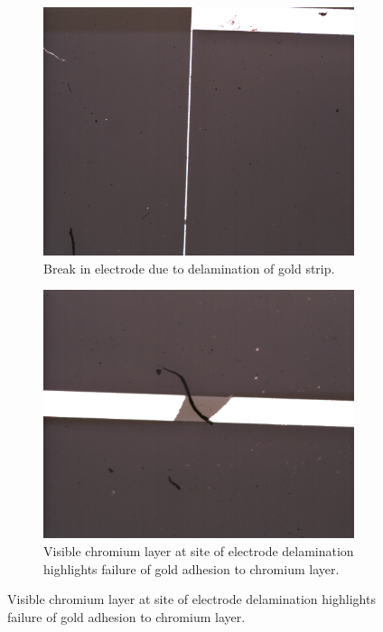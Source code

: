 \begin{figure}[h]
    \centering
    \begin{subfigure}[t]{0.45\textwidth}
        \centering
        \includegraphics[width=\textwidth]{images/electrodeFailureChunkBreak.png}
        \caption{Break in electrode due to delamination of gold strip.}
    \end{subfigure}
    \hfill
    \begin{subfigure}[t]{0.45\textwidth}
        \centering
        \includegraphics[width=\textwidth]{images/electrodeFailureChunkBreakZoomed.png}
        \caption{Visible chromium layer at site of electrode delamination highlights failure of gold adhesion to chromium layer.}

\end{subfigure}
\end{figure}
